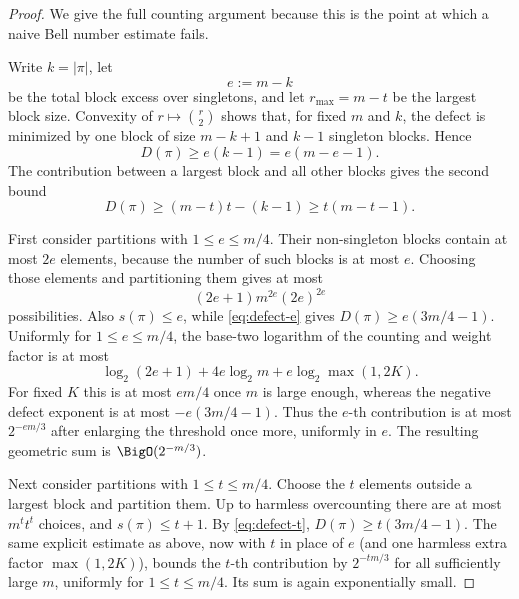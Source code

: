 \documentclass[11pt,oneside]{article}
\theoremstyle{definition}
\theoremstyle{remark}
\begin{document}
\begin{proof}
We give the full counting argument because this is the point at which a naive Bell
number estimate fails.

Write $k=|\pi|$, let
\begin{equation}
 e:=m-k
 \label{eq:excess}
\end{equation}
be the total block excess over singletons, and let $r_{\max}=m-t$ be the largest block
size.  Convexity of $r\mapsto\binom r2$ shows that, for fixed $m$ and $k$, the defect
is minimized by one block of size $m-k+1$ and $k-1$ singleton blocks.  Hence
\begin{equation}
 D(\pi)\geq e(k-1)=e(m-e-1).
 \label{eq:defect-e}
\end{equation}
The contribution between a largest block and all other blocks gives the second bound
\begin{equation}
 D(\pi)\geq (m-t)t-(k-1)\geq t(m-t-1).
 \label{eq:defect-t}
\end{equation}

First consider partitions with $1\leq e\leq m/4$.  Their non-singleton blocks contain
at most $2e$ elements, because the number of such blocks is at most $e$.  Choosing
those elements and partitioning them gives at most
\begin{equation}
  (2e+1)m^{2e}(2e)^{2e}
 \label{eq:count-near-singletons}
\end{equation}
possibilities.  Also $s(\pi)\leq e$, while \eqref{eq:defect-e} gives
$D(\pi)\geq e(3m/4-1)$.  Uniformly for $1\leq e\leq m/4$, the base-two logarithm
of the counting and weight factor is at most
\[
 \log_2(2e+1)+4e\log_2m+e\log_2\max(1,2K).
\]
For fixed $K$ this is at most $em/4$ once $m$ is large enough, whereas the
negative defect exponent is at most $-e(3m/4-1)$.  Thus the $e$-th contribution
is at most $2^{-em/3}$ after enlarging the threshold once more, uniformly in
$e$.  The resulting geometric sum is $\BigO(2^{-m/3})$.

Next consider partitions with $1\leq t\leq m/4$.  Choose the $t$ elements outside a
largest block and partition them.  Up to harmless overcounting there are at most
$m^t t^t$ choices, and $s(\pi)\leq t+1$.  By \eqref{eq:defect-t},
$D(\pi)\geq t(3m/4-1)$.  The same explicit estimate as above, now with $t$ in
place of $e$ (and one harmless extra factor $\max(1,2K)$), bounds the $t$-th
contribution by $2^{-tm/3}$ for all sufficiently large $m$, uniformly for
$1\leq t\leq m/4$.  Its sum is again exponentially small.


\end{proof}
\end{document}

